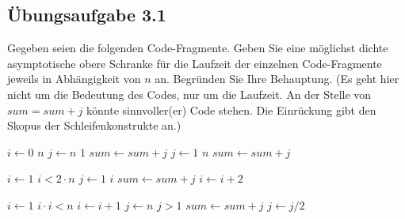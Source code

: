 \documentclass{article}
\begin{document}
\subsection{Übungsaufgabe 3.1}
\begin{flushright}
\begin{Large}
[~~~~\string| ~~3~]
\end{Large}
\end{flushright}
Gegeben seien die folgenden Code-Fragmente.
Geben Sie eine möglichst dichte asymptotische obere Schranke für die Laufzeit der einzelnen Code-Fragmente jeweils in Abhängigkeit von $n$ an.
Begründen Sie Ihre Behauptung.
(Es geht hier nicht um die Bedeutung des Codes, nur um die Laufzeit.
An der Stelle von $sum = sum + j$ könnte sinnvoller(er) Code stehen.
Die Einrückung gibt den Skopus der Schleifenkonstrukte an.) \\
\vspace{0.3cm}
\begin{minipage}[t]{0.32\textwidth}
	\begin{codebox}
		\li \For $i \gets 0$ \To $n$
		\Indentmore
			\li \For $j \gets n$ \Downto $1$
			\Indentmore
				\li $sum \gets sum+j$
			\End
			\li \For $j \gets 1$ \To $n$
			\Indentmore
				\li $sum \gets sum+j$
			\End
		\End
	\end{codebox}
\end{minipage}
\begin{minipage}[t]{0.32\textwidth}
	\begin{codebox}
		\Procname{\textsc{Algo2()}}
		\li $i \gets 1$
		\li \While $i < 2 \cdot n$
		\Indentmore
			\li \For $j \gets 1$ \To $i$
			\Indentmore
				\li $sum \gets sum+j$
			\End
			\li $i \gets i+2$
		\End
	\end{codebox}
\end{minipage}
\begin{minipage}[t]{0.32\textwidth}
	\begin{codebox}
		\Procname{\textsc{Algo3()}}
		\li $i \gets 1$
		\li \While $i \cdot i < n$
		\Indentmore
			\li $i \gets i+1$
			\li $j \gets n$
			\li \While $j > 1$
			\Indentmore
				\li $sum \gets sum+j$
				\li $j \gets j/2$
			\End
		\End
	\end{codebox}
\end{minipage}
\vspace{1cm}\-\\
\end{document}
